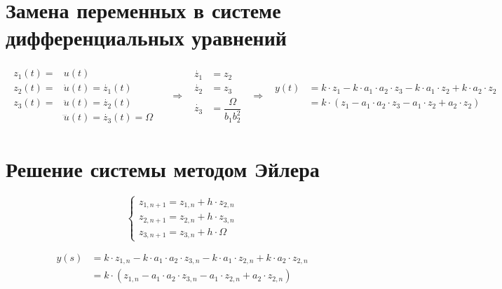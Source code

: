 \documentclass[a4paper, 12pt]{article}
\begin{document}
\section{Замена переменных в системе дифференциальных уравнений}
$$
    \begin{matrix}
        \begin{aligned}
            z_1(t) = &u(t) &
            \\
            z_2(t) = &\dot{u}(t) = \dot{z_1}(t) &
            \\
            z_3(t) = &\ddot{u}(t) = \dot{z_2}(t) &
            \\
            &\dddot{u}(t) = \dot{z_3}(t) = \Omega &
        \end{aligned}
        &
        \Rightarrow
        &
        \begin{aligned}
            \dot{z_1} &= z_2
            \\
            \dot{z_2} &= z_3
            \\
            \dot{z_3} &= \dfrac{\Omega}{b_1b_2^2}
        \end{aligned}
        &
        \Rightarrow
        &
        \begin{aligned}
        y(t)
        &= k \cdot z_{1} - k \cdot a_1 \cdot a_2 \cdot z_{3} - k \cdot a_1 \cdot z_{2} + k \cdot a_2 \cdot z_{2}
        \\
        &= k \cdot (z_{1} - a_1 \cdot a_2 \cdot z_{3} - a_1 \cdot z_{2} + a_2 \cdot z_{2})
        \end{aligned}
    \end{matrix}
$$

\section{Решение системы методом Эйлера}
$$
    \begin{cases}
        z_{1,n+1} = z_{1,n} + h \cdot z_{2,n}
        \\
        z_{2,n+1} = z_{2,n} + h \cdot z_{3,n}
        \\
        z_{3,n+1} = z_{3,n} + h \cdot \Omega
    \end{cases}
$$

$$
    \begin{aligned}
        y(s)
        &= k \cdot z_{1,n} - k \cdot a_1 \cdot a_2 \cdot z_{3,n} - k \cdot a_1 \cdot z_{2,n} + k \cdot a_2 \cdot z_{2,n}
        \\
        &= k \cdot (z_{1,n} - a_1 \cdot a_2 \cdot z_{3,n} - a_1 \cdot z_{2,n} + a_2 \cdot z_{2,n})
    \end{aligned}
$$
\end{document}
